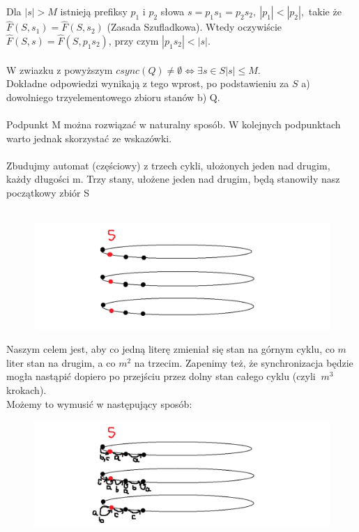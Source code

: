 \documentclass[a4paper,11pt]{article}
\newenvironment{zadanie}[1]
  {\renewcommand\theinnercustomthm{#1}\innercustomthm}
  {\endinnercustomthm}
\begin{document}
Dla $|s| > M$ istnieją prefiksy $p_1$ i $p_2$ słowa $s = p_1s_1 = p_2s_2, \ |p_1| < |p_2|,$ takie że 
$\widehat{F}(S,s_1) = \widehat{F}(S,s_2)$ (Zasada Szufladkowa). Wtedy oczywiście $\widehat{F}(S,s) = \widehat{F}(S,p_1s_2)$, przy czym 
$|p_1s_2| < |s|$. \\ \\
W zwiazku z powyższym $csync(Q) \neq \emptyset \Longleftrightarrow \exists s \in S |s| \leqslant M$. \\
Dokładne odpowiedzi wynikają z tego wprost, po podstawieniu za $S$ a) dowolniego trzyelementowego zbioru stanów b) Q. \\ \\

\begin{zadanie}{42}
\end{zadanie}
Podpunkt M można rozwiązać w naturalny sposób. W kolejnych podpunktach warto jednak skorzystać ze wskazówki. \\ \\

Zbudujmy automat (częściowy) z trzech cykli, ułożonych jeden nad drugim, każdy długości m. Trzy stany, ułożene jeden nad
drugim, będą stanowiły nasz początkowy zbiór S \\ \\

\begin{figure}[h!]
  \centerline{%
    \includegraphics[width=18cm]{zad42.png}%
  }%
\end{figure}

Naszym celem jest, aby co jedną literę zmieniał się stan na górnym cyklu, co $m$ liter stan na drugim, a co $m^2$ na trzecim.
Zapenimy też, że synchronizacja będzie mogła nastąpić dopiero po przejściu przez dolny stan całego cyklu (czyli $~m^3$ krokach). \\
Możemy to wymusić w następujący sposób: \\

\begin{figure}[h!]
  \centerline{%
    \includegraphics[width=18cm]{zad42_2.png}%
  }%
\end{figure}
\end{document}
